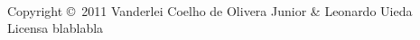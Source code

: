 \thispagestyle{empty}
\clearpage

\\[1cm]
\noindent Copyright \copyright\ 2011
Vanderlei Coelho de Olivera Junior \& Leonardo Uieda
\\[0.5cm]
\noindent Licensa blablabla
